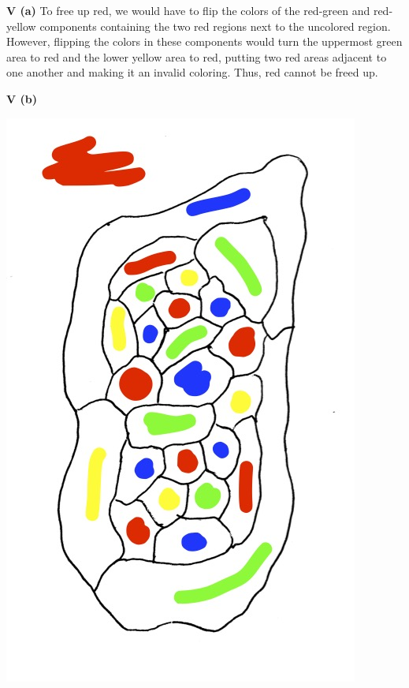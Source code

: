 \documentclass[12pt]{article}
\begin{document}
\medskip\noindent\textbf{V (a)}
To free up red, we would have to flip the colors of the red-green and red-yellow components containing the two red regions next to the uncolored region. However, flipping the colors in these components would turn the uppermost green area to red and the lower yellow area to red, putting two red areas adjacent to one another and making it an invalid coloring. Thus, red cannot be freed up.

\pagebreak
\medskip\noindent\textbf{V (b)}
\begin{center} \includegraphics[scale=.5]{heawood.jpg} \end{center}
\end{document}
